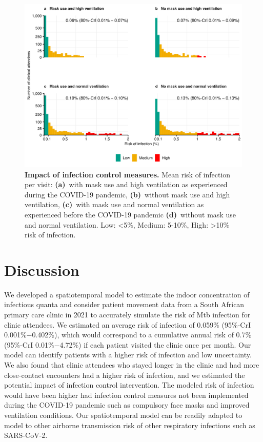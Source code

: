 \documentclass[fleqn,11pt]{wlscirep}
\begin{document}
\begin{figure}
    \centering
    \includegraphics{results/modeling/mean-roi-comparison.png}
    \caption{\textbf{Impact of infection control measures.} Mean risk of infection per visit: \textbf{(a)}~with mask use and high ventilation as experienced during the COVID-19 pandemic, \textbf{(b)}~without mask use and high ventilation, \textbf{(c)}~with mask use and normal ventilation as experienced before the COVID-19 pandemic  \textbf{(d)}~without mask use and normal ventilation. Low: <5\%, Medium: 5-10\%, High: >10\% risk of infection.}
    \label{fig:scenario-results}
\end{figure}


\FloatBarrier

\newpage

\section{Discussion}

We developed a spatiotemporal model to estimate the indoor concentration of infectious quanta and consider patient movement data from a South African primary care clinic in 2021 to accurately simulate the risk of Mtb infection for clinic attendees. We estimated an average risk of infection of 0.059\% (95\%-CrI 0.001\%$-$0.402\%), which would correspond to a cumulative annual risk of 0.7\% (95\%-CrI 0.01\%$-$4.72\%) if each patient visited the clinic once per month. Our model can identify patients with a higher risk of infection and low uncertainty. We also found that clinic attendees who stayed longer in the clinic and had more close-contact encounters  had a higher risk of infection, and we estimated the potential impact of infection control intervention. The modeled risk of infection would have been higher had infection control measures not been implemented during the COVID-19 pandemic such as compulsory face masks and improved ventilation conditions. Our spatiotemporal model can be readily adapted to model to other airborne transmission risk of other respiratory infections such as SARS-CoV-2.
\end{document}
